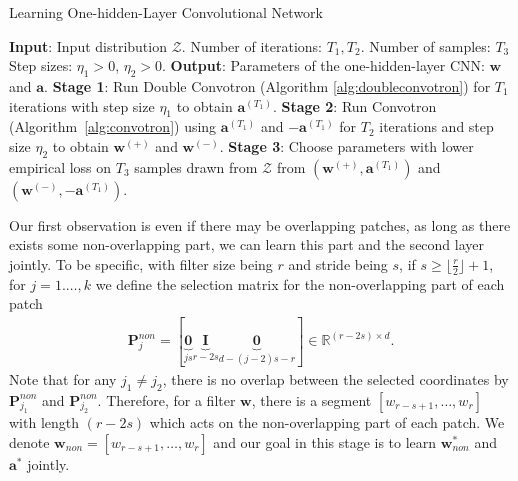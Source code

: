 \documentclass[11pt]{article}
\newcommand{\mat}[1]{\mathbf{#1}}
\newcommand{\vect}[1]{\mathbf{#1}}
\newcommand{\inputdist}{\mathcal{Z}}
\newcommand{\simon}[1]{\textcolor{blue}{[Simon: #1]}}
\begin{document}
\begin{algorithm}[t]
  \caption{Learning One-hidden-Layer Convolutional Network\label{algo:main}}
  \begin{algorithmic}[1]
    \Statex \textbf{Input}: Input distribution $\inputdist$. Number of iterations: $T_1, T_2$. Number of samples: $T_3$%
    Step sizes: $\eta_1 > 0$, $\eta_2 > 0$.
   \Statex \textbf{Output}: Parameters of the one-hidden-layer CNN: $\vect{w}$ and $\vect{a}$.
     \State \textbf{Stage 1}: Run Double Convotron (Algorithm \ref{alg:doubleconvotron}) for $T_1$ iterations with step size $\eta_1$ to obtain $\vect{a}^{(T_1)}$.
     \State \textbf{Stage 2}: Run Convotron (Algorithm~\ref{alg:convotron})  using  $\vect{a}^{(T_1)}$ and $-\vect{a}^{(T_1)}$ for $T_2$ iterations and step size $\eta_2$ to obtain $\vect{w}^{(+)}$ and $\vect{w}^{(-)}$.
   \State \textbf{Stage 3}: Choose parameters with lower empirical loss on $T_3$ samples drawn from $\inputdist$ from $\left(\vect{w}^{(+)},\vect{a}^{(T_1)}\right)$ and $\left(\vect{w}^{(-)},-\vect{a}^{(T_1)}\right)$.
\end{algorithmic}
\end{algorithm}%
Our first observation is even if there may be overlapping patches, as long as there exists some non-overlapping part, we can learn this part and the second layer jointly.
To be specific, with filter size being $r$ and stride being $s$, if $s \ge \lfloor \frac{r}{2}\rfloor + 1$, for $j=1.\ldots,k$ we define the selection matrix for the non-overlapping part of each patch\begin{align*}
\mat{P}_j^{non} = 
[\underbrace{\mat{0}}_{js}  \underbrace{\mat{I}}_{r-2s}   \underbrace{\mat{0}}_{d-(j-2)s-r}] \in \mathbb{R}^{(r-2s) \times d}.
\end{align*} 
Note that for any $j_1 \neq j_2$, there is no overlap between the selected coordinates by $\mat{P}_{j_1}^{non}$ and 
$\mat{P}_{j_2}^{non}$. 
Therefore, for a filter $\vect{w}$, there is a segment $\left[w_{r-s+1},\ldots,w_{r}\right]$ with length $(r-2s)$ which acts on the non-overlapping part of each patch. 
We denote $\vect{w}_{non} = \left[w_{r-s+1},\ldots,w_{r}\right]$ and our goal in this stage is to learn $\vect{w}_{non}^*$ and $\vect{a}^*$ jointly.
\end{document}
